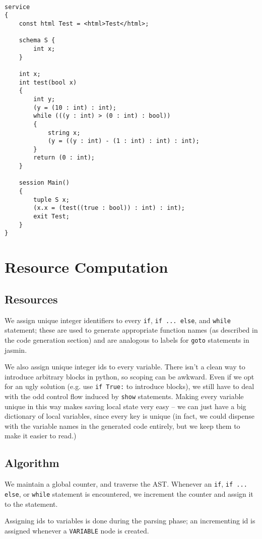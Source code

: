\documentclass{WigReport}
\begin{document}
\begin{verbatim}

service
{
    const html Test = <html>Test</html>;

    schema S {
        int x;
    }

    int x;
    int test(bool x)
    {
        int y;
        (y = (10 : int) : int);
        while (((y : int) > (0 : int) : bool))
        {
            string x;
            (y = ((y : int) - (1 : int) : int) : int);
        }
        return (0 : int);
    }

    session Main()
    {
        tuple S x;
        (x.x = (test((true : bool)) : int) : int);
        exit Test;
    }
}
\end{verbatim}

\clearpage

\section{Resource Computation}
\subsection{Resources}
We assign unique integer identifiers to every {\tt if}, {\tt if ... else},
and {\tt while} statement; these are used to generate appropriate function
names (as described in the code generation section) and are analogous to
labels for {\tt goto} statements in jasmin.

We also assign unique integer ids to every variable. There isn't a clean
way to introduce arbitrary blocks in python, so scoping can be awkward.
Even if we opt for an ugly solution (e.g. use {\tt if True:} to introduce
blocks), we still have to deal with the odd control flow induced by
{\tt show} statements. Making every variable unique in this way makes
saving local state very easy -- we can just have a big dictionary of local
variables, since every key is unique (in fact, we could dispense with the
variable names in the generated code entirely, but we keep them to make it
easier to read.)

\subsection{Algorithm}
We maintain a global counter, and traverse the AST. Whenever an {\tt if},
{\tt if ... else}, or {\tt while} statement is encountered, we increment
the counter and assign it to the statement.

Assigning ids to variables is done during the parsing phase; an
incrementing id is assigned whenever a {\tt VARIABLE} node is created.
\end{document}
